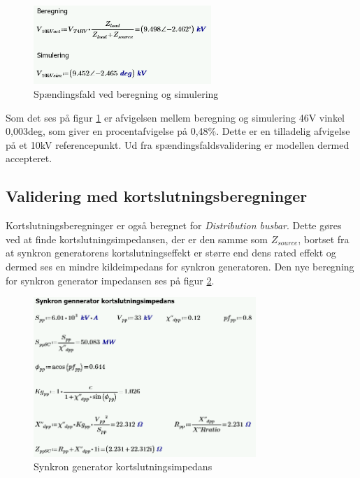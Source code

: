  \begin{figure}[H] %
 	\centering
 	\includegraphics[width=0.6\textwidth]{figurer/Spaendingsfald_validering}
 	\caption{Spændingsfald ved beregning og simulering}
 	\label{fig:Spaendingsfald_validering}
 \end{figure}
 
 Som det ses på figur \ref{fig:Spaendingsfald_validering} er afvigelsen mellem beregning og simulering 46V vinkel 0,003deg, som giver en procentafvigelse på 0,48\%. Dette er en tilladelig afvigelse på et 10kV referencepunkt. Ud fra spændingsfaldsvalidering er modellen dermed accepteret.
 
\subsection{Validering med kortslutningsberegninger}
Kortslutningsberegninger er også beregnet for \textit{Distribution busbar}. Dette gøres ved at finde kortslutningsimpedansen, der er den samme som $Z_{source}$, bortset fra at synkron generatorens kortslutningseffekt er større end dens rated effekt og dermed ses en mindre kildeimpedans for synkron generatoren. Den nye beregning for synkron generator impedansen ses på figur \ref{fig:SGimpedansSC}.

\begin{figure}[H] %
	\centering
	\includegraphics[width=0.75\textwidth]{figurer/Synkron_generator_valideringSC}
	\caption{Synkron generator kortslutningsimpedans}
	\label{fig:SGimpedansSC}
\end{figure}

